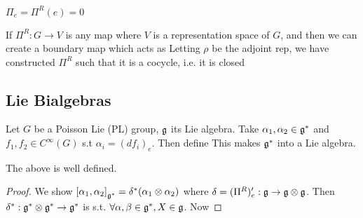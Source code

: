 \documentclass{article}
\begin{document}
\begin{corollary}
$\Pi_e = \Pi^R(e) = 0 $
\end{corollary}

\begin{aside}
If $\Pi^R : G \to V$ is any map where $V$ is a representation space of $G$, and then we can create a boundary map which acts as 
Letting $\rho$ be the adjoint rep, we have constructed $\Pi^R$ such that it is a cocycle, i.e. it is closed 
\end{aside}



\subsection{Lie Bialgebras}

\begin{definition}
Let $G$ be a Poisson Lie (PL) group, $\mf{g}$ its Lie algebra. Take $\alpha_1, \alpha_2 \in \mf{g}^\ast$ and $f_1,f_2 \in C^\infty(G)$ s.t $\alpha_i = (df_i)_e$. Then define
This makes $\mf{g}^\ast$ into a Lie algebra. 
\end{definition}

\begin{lemma}
The above is well defined. 
\end{lemma}
\begin{proof}
We show $\comm[\alpha_1]{\alpha_2}_{\mf{g}^\ast} = \delta^\ast (\alpha_1 \otimes \alpha_2)$ where $\delta = (\Pi^R)^\prime_e : \mf{g} \to \mf{g}\otimes \mf{g}$. Then $\delta^\ast : \mf{g}^\ast \otimes \mf{g}^\ast \to \mf{g}^\ast$ is s.t. $\forall \alpha,\beta\in\mf{g}^\ast, X \in \mf{g}$.
Now 
\end{proof}
\end{document}
